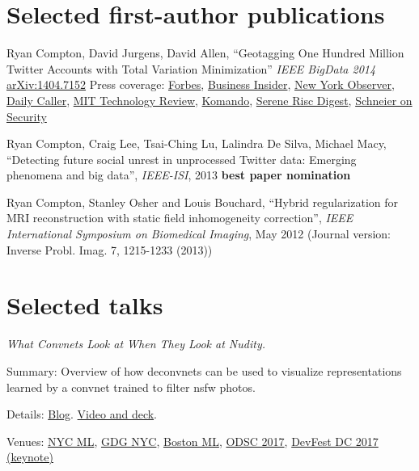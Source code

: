 \documentclass[margin,line]{res}
\newenvironment{list1}{
  \begin{list}{\ding{113}}{%
      \setlength{\itemsep}{0in}
      \setlength{\parsep}{0in} \setlength{\parskip}{0in}
      \setlength{\topsep}{0in} \setlength{\partopsep}{0in} 
      \setlength{\leftmargin}{0.17in}}}{\end{list}}
\begin{document}
\begin{resume}
\section{\sc Selected first-author publications}

Ryan Compton, David Jurgens, David Allen, ``Geotagging One Hundred Million Twitter Accounts with Total Variation Minimization'' {\it IEEE BigData 2014} \href{https://arxiv.org/abs/1404.7152}{arXiv:1404.7152} Press coverage: \href{http://www.forbes.com/sites/thomasbrewster/2015/03/07/twitter-location-can-be-determined-through-friends/}{Forbes}, \href{http://www.businessinsider.com/twitter-location-research-at-mentions-cornell-2015-3}{Business Insider}, \href{http://observer.com/2015/03/you-dont-have-to-geotag-your-tweets-to-give-away-your-location/}{New York Observer}, \href{http://dailycaller.com/2015/03/06/how-your-tweets-can-reveal-your-real-location/}{Daily Caller}, \href{http://www.technologyreview.com/view/527246/other-interesting-arxiv-papers-week-ending-may-10-2014/}{MIT Technology Review}, \href{http://www.komando.com/happening-now/299085/forget-gps-hackers-can-pinpoint-your-exact-location-using-social-media/all}{Komando}, \href{http://ryancompton.net/assets/resume/Serene_Risc_Digest_2015_Spring.pdf}{Serene Risc Digest}, \href{http://www.schneier.com/blog/archives/2015/03/geotagging_twit.html}{Schneier on Security}

Ryan Compton, Craig Lee, Tsai-Ching Lu, Lalindra De Silva, Michael Macy, ``Detecting future social unrest in unprocessed Twitter data: Emerging phenomena and big data'', {\it IEEE-ISI}, 2013 {\bf best paper nomination}

Ryan Compton, Stanley Osher and Louis Bouchard, ``Hybrid regularization for MRI reconstruction with static field inhomogeneity correction'', {\it IEEE International Symposium on Biomedical Imaging}, May 2012 (Journal version: Inverse Probl. Imag. 7, 1215-1233 (2013))

\section{\sc Selected talks}

{\it What Convnets Look at When They Look at Nudity.} 
\begin{list1}
\item [] Summary: Overview of how deconvnets can be used to visualize representations learned by a convnet trained to filter nsfw photos.
\item [] Details: \href{http://blog.clarifai.com/what-convolutional-neural-networks-see-at-when-they-see-nudity/}{Blog}. \href{http://ryancompton.net/2016/12/06/my-talk-at-the-nyc-machine-learning-meetup/}{Video and deck}.
\item [] Venues: \href{https://www.meetup.com/NYC-Machine-Learning/events/235535192/}{NYC ML}, \href{https://www.meetup.com/gdgnyc/events/231372185/}{GDG NYC}, \href{https://www.meetup.com/bostonml/events/235419742/}{Boston ML}, \href{https://www.odsc.com/training/portfolio/convolutional-neural-networks-look-look-nudity}{ODSC 2017}, \href{http://www.devfestdc.org/speakers/ryan-compton/}{DevFest DC 2017 (keynote)} 
\end{list1}


\end{resume}
\end{document}
